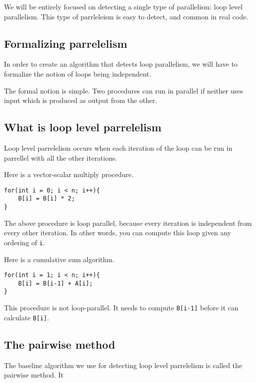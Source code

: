 \documentclass[12pt,twoside]{reedthesis}
\begin{document}
		We will be entirely focused on  detecting a single type of parallelism: loop level parallelism. This type of parrleleism is easy to detect, and common in real code. 
		
		\subsection{Formalizing parrelelism}
			
			In order to create an algorithm that detects loop parallelism, we will have to formalize the notion of loops being independent.
			
			The formal notion is simple. Two procedures can run in parallel if neither uses input which is produced as output from the other.
			
		\subsection{What is loop level parrelelism}
		
			Loop level parrelelism occurs when each iteration of the loop can be run in parrellel with all the other iterations. 
		
			Here is a vector-scalar multiply procedure. 
			
			\begin{lstlisting}
for(int i = 0; i < n; i++){
	B[i] = B[i] * 2;
}
			\end{lstlisting}
			
			The above procedure is loop parallel, because every iteration is independent from every other iteration. In other words, you can compute this loop given any ordering of \texttt{i}.
			
			
			Here is a cumulative sum algorithm. 
			
			\begin{lstlisting}
for(int i = 1; i < n; i++){
	B[i] = B[i-1] + A[i];
}
			\end{lstlisting}
			
			This procedure is not loop-parallel. It needs to compute \texttt{B[i-1]} before it can calculate \texttt{B[i]}. 
			
		\subsection{The pairwise method}
			
			The baseline algorithm we use for detecting loop level parrelelism is called the pairwise method. It 
			
\end{document}
